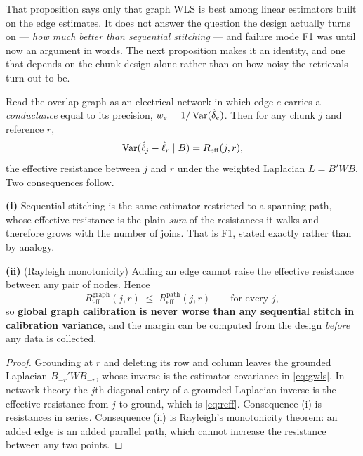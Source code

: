 \documentclass[12pt,a4paper,oneside]{article}
\begin{document}
That proposition says only that graph WLS is best among linear estimators built
on the edge estimates. It does not answer the question the design actually turns
on --- \emph{how much better than sequential stitching} --- and failure mode F1
was until now an argument in words. The next proposition makes it an identity,
and one that depends on the chunk design alone rather than on how noisy the
retrievals turn out to be.

\begin{proposition}\label{prop:reff}
Read the overlap graph as an electrical network in which edge $e$ carries a
\emph{conductance} equal to its precision, $w_e = 1/\operatorname{Var}(\hat\delta_e)$. Then for
any chunk $j$ and reference $r$,
\begin{equation}
\operatorname{Var}(\hat\ell_j - \hat\ell_r \mid B) = R_{\mathrm{eff}}(j, r),
\label{eq:reff}
\end{equation}
the effective resistance between $j$ and $r$ under the weighted Laplacian
$L = B'WB$. Two consequences follow.

\textbf{(i)} Sequential stitching is the same estimator restricted to a spanning
path, whose effective resistance is the plain \emph{sum} of the resistances it
walks and therefore grows with the number of joins. That is F1, stated exactly
rather than by analogy.

\textbf{(ii)} (Rayleigh monotonicity) Adding an edge cannot raise the effective
resistance between any pair of nodes. Hence
\begin{equation}
R_{\mathrm{eff}}^{\text{graph}}(j, r) \;\le\; R_{\mathrm{eff}}^{\text{path}}(j, r)
\qquad \text{for every } j,
\label{eq:rayleigh}
\end{equation}
so \textbf{global graph calibration is never worse than any sequential stitch in
calibration variance}, and the margin can be computed from the design
\emph{before} any data is collected.
\end{proposition}

\begin{proof}
Grounding at $r$ and deleting its row and column leaves the grounded Laplacian
$B_{-r}'WB_{-r}$, whose inverse is the estimator covariance in \eqref{eq:gwls}.
In network theory the $j$th diagonal entry of a grounded Laplacian inverse is the
effective resistance from $j$ to ground, which is \eqref{eq:reff}. Consequence
(i) is resistances in series. Consequence (ii) is Rayleigh's monotonicity
theorem: an added edge is an added parallel path, which cannot increase the
resistance between any two points.
\end{proof}
\end{document}
